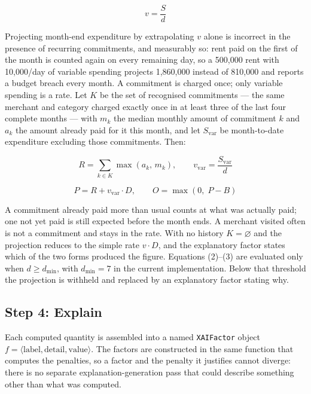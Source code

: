 \documentclass[conference]{IEEEtran}
\begin{document}
\begin{equation}
v = \frac{S}{d}
\end{equation}

Projecting month-end expenditure by extrapolating $v$ alone is incorrect in the presence of recurring commitments, and measurably so: rent paid on the first of the month is counted again on every remaining day, so a \mbox{\textrm{\textwon}500,000} rent with \mbox{\textrm{\textwon}10,000}/day of variable spending projects \mbox{\textrm{\textwon}1,860,000} instead of \mbox{\textrm{\textwon}810,000} and reports a budget breach every month. A commitment is charged once; only variable spending is a rate. Let $K$ be the set of recognised commitments --- the same merchant and category charged exactly once in at least three of the last four complete months --- with $m_k$ the median monthly amount of commitment $k$ and $a_k$ the amount already paid for it this month, and let $S_{\mathrm{var}}$ be month-to-date expenditure excluding those commitments. Then:

\begin{equation}
R = \sum_{k \in K} \max(a_k,\, m_k), \qquad v_{\mathrm{var}} = \frac{S_{\mathrm{var}}}{d}
\end{equation}

\begin{equation}
P = R + v_{\mathrm{var}} \cdot D, \qquad O = \max(0,\; P - B)
\end{equation}

A commitment already paid more than usual counts at what was actually paid; one not yet paid is still expected before the month ends. A merchant visited often is not a commitment and stays in the rate. With no history $K = \varnothing$ and the projection reduces to the simple rate $v \cdot D$, and the explanatory factor states which of the two forms produced the figure. Equations (2)--(3) are evaluated only when $d \geq d_{\min}$, with $d_{\min} = 7$ in the current implementation. Below that threshold the projection is withheld and replaced by an explanatory factor stating why.

\subsection{Step 4: Explain}

Each computed quantity is assembled into a named \texttt{XAIFactor} object $f = \langle \text{label}, \text{detail}, \text{value} \rangle$. The factors are constructed in the same function that computes the penalties, so a factor and the penalty it justifies cannot diverge: there is no separate explanation-generation pass that could describe something other than what was computed.
\end{document}
